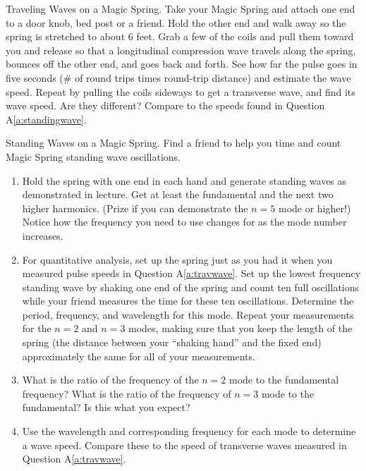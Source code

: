 \begin{aproblem}{Traveling Waves on a Magic Spring.} 
  Take your Magic Spring and attach one end to a door knob, bed post
  or a friend.  Hold the other end and walk away so the spring is
  stretched to about 6 feet.  Grab a few of the coils and pull them
  toward you and release so that a longitudinal compression wave
  travels along the spring, bounces off the other end, and goes back
  and forth.  See how far the pulse goes in five seconds (\# of round
  trips times round-trip distance) and estimate the wave speed.
  Repeat by pulling the coils sideways to get a transverse wave, and
  find its wave speed.  Are they different?  Compare to the speeds
  found in Question A\ref{a:standingwave}. \label{a:travwave}
\end{aproblem}


\begin{aproblem}{Standing Waves on a Magic Spring.}  
  Find a friend to help you time and count Magic Spring standing wave
  oscillations.
  \begin{enumerate}
  \item Hold the spring with one end in each hand and generate
    standing waves as demonstrated in lecture.  Get at least the
    fundamental and the next two higher harmonics.  (Prize if you can
    demonstrate the $n=5$ mode or higher!)  Notice how the frequency
    you need to use changes for as the mode number increases.
  \item For quantitative analysis, set up the spring just as you had
    it when you measured pulse speeds in Question A\ref{a:travwave}.
    Set up the lowest frequency standing wave by shaking one end of
    the spring and count ten full oscillations while your friend
    measures the time for these ten oscillations.  Determine the
    period, frequency, and wavelength for this mode.  Repeat your
    measurements for the $n=2$ and $n=3$ modes, making sure that you
    keep the length of the spring (the distance between your ``shaking
    hand'' and the fixed end) approximately the same for all of your
    measurements.
  \item What is the ratio of the frequency of the $n = 2$ mode to the
    fundamental frequency?  What is the ratio of the frequency of $n =
    3$ mode to the fundamental?  Is this what you expect?
  \item Use the wavelength and corresponding frequency for each mode
    to determine a wave speed.  Compare these to the speed of
    transverse waves measured in Question A\ref{a:travwave}.
  \end{enumerate}
  \label{a:standingwave}
\end{aproblem}


